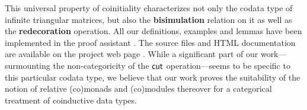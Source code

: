 \documentclass{llncs}
\newcommand{\fat}[1]{\textbf{#1}}
\begin{document}
% 
% 
This universal property of coinitiality characterizes not only the codata type of infinite triangular matrices, but also
the \fat{bisimulation} relation on it as well as the \fat{redecoration} operation.
 All our definitions, examples and lemmas have been implemented in the proof assistant \coq. %
 The \coq source files and HTML documentation are available on the project web page \parencite{trimat_coq}.
 While a significant part of our work---surmounting the non-categoricity of the $\mathsf{cut}$ operation---seems to be specific to this particular codata type,
 we believe that our work proves the suitability of the notion of relative (co)monads and (co)modules thereover for 
 a categorical treatment of coinductive data types.


 


\renewcommand*{\bibfont}{\small}
\printbibliography[heading=none]
\end{document}
